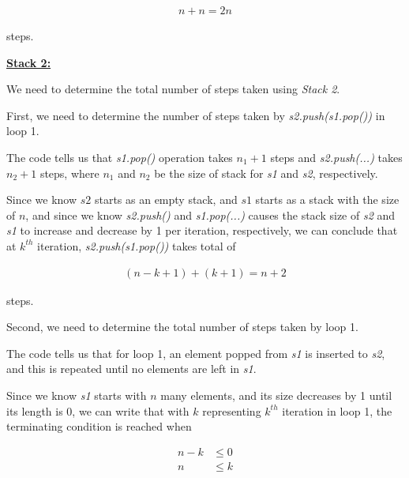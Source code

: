 \documentclass[12pt]{article}
\begin{document}
\begin{enumerate}[a.]
\begin{mdframed}
    \color{red}
    \begin{align}
        n + n = 2n
    \end{align}
    \color{black}

    steps.

    \bigskip

    \underline{\textbf{Stack 2:}}

    \bigskip

    We need to determine the total number of steps taken using \textit{Stack 2}.

    \bigskip

    First, we need to determine the number of steps taken by \textit{s2.push(s1.pop())} in loop 1.

    \bigskip

    The code tells us that \textit{s1.pop()} operation takes $n_1 + 1$ steps and
    \textit{s2.push(...)} takes $n_2 + 1$ steps, where $n_1$ and $n_2$
    be the size of stack for \textit{s1} and \textit{s2}, respectively.

    \bigskip

    Since we know $s2$ starts as an empty stack, and $s1$ starts as a stack
    with the size of $n$, and since we know \textit{s2.push()} and \textit{s1.pop(...)} causes the
    stack size of \textit{s2} and \textit{s1} to increase and decrease by 1 per iteration, respectively,
    we can conclude that at $k^{th}$ iteration, \textit{s2.push(s1.pop())}
    takes total of

    \setcounter{equation}{0}
    \begin{align}
        (n - k + 1) + (k + 1) = n + 2
    \end{align}

    steps.

    \bigskip

    Second, we need to determine the total number of steps taken by loop 1.

    \bigskip

    The code tells us that for loop 1, an element popped from \textit{s1} is inserted to \textit{s2},
    and this is repeated until no elements are left in \textit{s1}.

    \bigskip

    Since we know \textit{s1} starts with $n$ many elements, and its size decreases
    by 1 until its length is 0, we can write that with $k$ representing
    $k^{th}$ iteration in loop 1, the terminating condition is reached when

    \begin{align}
        n - k &\leq 0\\
        n &\leq k
    \end{align}


\end{mdframed}
\end{enumerate}
\end{document}
